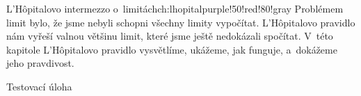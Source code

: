\begin{chapterintro}{L'Hôpitalovo intermezzo o~limitách}{ch:lhopital}{purple!50!red!80!gray}{}
    Problémem limit bylo, že jsme nebyli schopni všechny limity vypočítat.
    L'Hôpitalovo pravidlo nám vyřeší valnou většinu limit, které jsme ještě
    nedokázali spočítat. V~této kapitole L'Hôpitalovo pravidlo vysvětlíme, ukážeme,
    jak funguje, a~dokážeme jeho pravdivost.
\end{chapterintro}

\begin{exercise}
    Testovací úloha
\end{exercise}